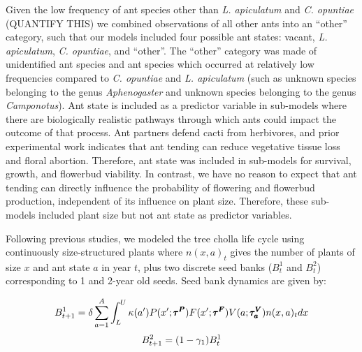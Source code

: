\documentclass[11pt]{article}
\begin{document}
Given the low frequency of ant species other than \textit{L. apiculatum} and \textit{C. opuntiae} (QUANTIFY THIS) we combined observations of all other ants into an ``other'' category, such that our models included four possible ant states: vacant, \textit{L. apiculatum}, \textit{C. opuntiae}, and ``other''. 
The ``other'' category was made of unidentified ant species and ant species which occurred at relatively low frequencies compared to \textit{C. opuntiae} and \textit{L. apiculatum} (such as unknown species belonging to the genus \textit{Aphenogaster} and unknown species belonging to the genus \textit{Camponotus}).
Ant state is included as a predictor variable in sub-models where there are biologically realistic pathways through which ants could impact the outcome of that process. 
Ant partners defend cacti from herbivores, and prior experimental work indicates that ant tending can reduce vegetative tissue loss and floral abortion.
Therefore, ant state was included in sub-models for survival, growth, and flowerbud viability. 
In contrast, we have no reason to expect that ant tending can directly influence the probability of flowering and flowerbud production, independent of its influence on plant size. 
Therefore, these sub-models included plant size but not ant state as predictor variables. 

Following previous studies, we modeled the tree cholla life cycle using continuously size-structured plants where $n(x,a)_{t}$ gives the number of plants of size $x$ and ant state $a$ in year $t$, plus two discrete seed banks ($B^1_{t}$ and $B^2_{t}$) corresponding to 1 and 2-year old seeds.
Seed bank dynamics are given by:

\begin{linenomath*}
	$$
	B^1_{t+1} = \delta \sum_{a=1}^{A} \int_L^U  \kappa(a') P(x';\pmb{\tau^P}) F(x';\pmb{\tau^F}) V(a;\pmb{\tau^V_{a}}) n(x,a)_{t} dx \\
	$$
	$$
	B^2_{t+1} =  (1 - \gamma_1)B^1_{t}\\
	$$
\end{linenomath*}
\end{document}
